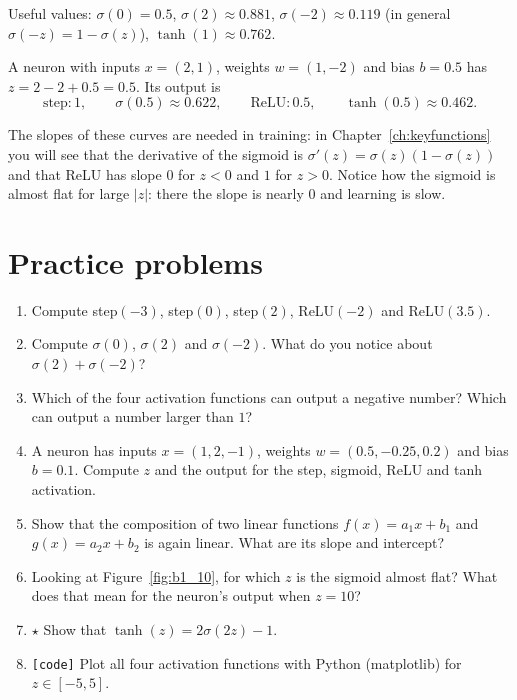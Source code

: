 Useful values: $\sigma(0)=0.5$, $\sigma(2)\approx0.881$, $\sigma(-2)\approx0.119$ (in general $\sigma(-z)=1-\sigma(z)$), $\tanh(1)\approx0.762$.

\begin{example}
A neuron with inputs $x=(2,1)$, weights $w=(1,-2)$ and bias $b=0.5$ has $z=2-2+0.5=0.5$. Its output is
\[
\text{step}: 1,\qquad \sigma(0.5)\approx0.622,\qquad \text{ReLU}: 0.5,\qquad \tanh(0.5)\approx0.462.
\]
\end{example}

\begin{aibox}
The slopes of these curves are needed in training: in Chapter~\ref{ch:keyfunctions} you will see that the derivative of the sigmoid is $\sigma'(z)=\sigma(z)(1-\sigma(z))$ and that ReLU has slope $0$ for $z<0$ and $1$ for $z>0$. Notice how the sigmoid is almost flat for large $|z|$: there the slope is nearly $0$ and learning is slow.
\end{aibox}

\section*{Practice problems}
\begin{enumerate}[label=\textbf{\thechapter.\arabic*}]
  \item Compute step$(-3)$, step$(0)$, step$(2)$, ReLU$(-2)$ and ReLU$(3.5)$.
  \item Compute $\sigma(0)$, $\sigma(2)$ and $\sigma(-2)$. What do you notice about $\sigma(2)+\sigma(-2)$?
  \item Which of the four activation functions can output a negative number? Which can output a number larger than $1$?
  \item A neuron has inputs $x=(1,2,-1)$, weights $w=(0.5,-0.25,0.2)$ and bias $b=0.1$. Compute $z$ and the output for the step, sigmoid, ReLU and tanh activation.
  \item Show that the composition of two linear functions $f(x)=a_1x+b_1$ and $g(x)=a_2x+b_2$ is again linear. What are its slope and intercept?
  \item Looking at Figure~\ref{fig:b1_10}, for which $z$ is the sigmoid almost flat? What does that mean for the neuron's output when $z=10$?
  \item $\star$ Show that $\tanh(z)=2\sigma(2z)-1$.
  \item \texttt{[code]} Plot all four activation functions with Python (matplotlib) for $z\in[-5,5]$.
\end{enumerate}

\newpage
